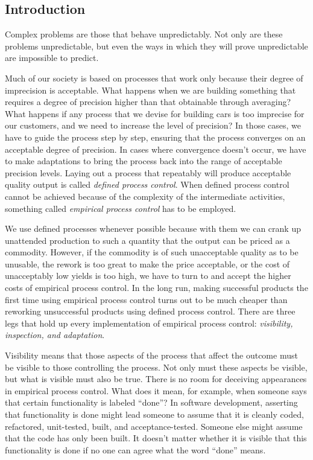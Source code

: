
\subsection{Introduction}

Complex problems are those that behave unpredictably. Not only are these problems unpredictable, but even the ways in which they will prove unpredictable are impossible to predict.

Much of our society is based on processes that work only because their degree of imprecision is acceptable. What happens when we are building something that requires a degree of precision higher than that obtainable through averaging? What happens if any process that we devise for building cars is too imprecise for our customers, and we need to increase the level of precision? In those cases, we have to guide the process step by step, ensuring that the process converges on an acceptable degree of precision. In cases where convergence doesn’t occur, we have to make adaptations to bring the process back into the range of acceptable precision levels. Laying out a process that repeatably will produce acceptable quality output is called \emph{defined process control}. When defined process control cannot be achieved because of the complexity of the intermediate activities, something called \emph{empirical process control} has to be employed.

We use defined processes whenever possible because with them we can crank up unattended production to such a quantity that the output can be priced as a commodity. However, if the commodity is of such unacceptable quality as to be unusable, the rework is too great to make the price acceptable, or the cost of unacceptably low yields is too high, we have to turn to and accept the higher costs of empirical process control. In the long run, making successful products the first time using empirical process control turns out to be much cheaper than reworking unsuccessful products using defined process control. There are three legs that hold up every implementation of empirical process control: \emph{visibility, inspection, and adaptation}.

Visibility means that those aspects of the process that affect the outcome must be visible to those controlling the process. Not only must these aspects be visible, but what is visible must also be true. There is no room for deceiving appearances in empirical process control. What does it mean, for example, when someone says that certain functionality is labeled “done”? In software development, asserting that functionality is done might lead someone to assume that it is cleanly coded, refactored, unit-tested, built, and acceptance-tested. Someone else might assume that the code has only been built. It doesn’t matter whether it is visible that this functionality is done if no one can agree what the word “done” means.

